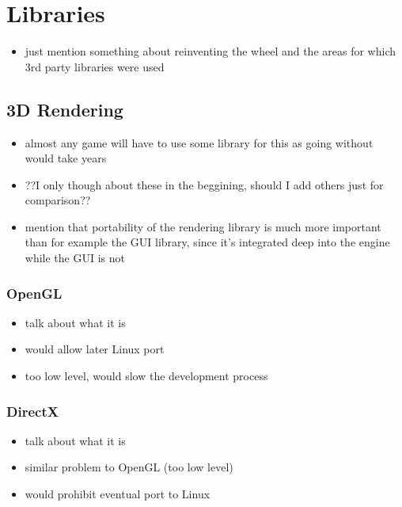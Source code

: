\section{Libraries}

\begin{itemize}
    \item just mention something about reinventing the wheel and
        the areas for which 3rd party libraries were used
\end{itemize}

\subsection{3D Rendering}

\begin{itemize}
    \item almost any game will have to use some library for this as
        going without would take years
    \item ??I only though about these in the beggining, should I add
        others just for comparison??
    \item mention that portability of the rendering library is much more
        important than for example the GUI library, since it's integrated
        deep into the engine while the GUI is not
\end{itemize}

\subsubsection{OpenGL}

\begin{itemize}
    \item talk about what it is
    \item would allow later Linux port
    \item too low level, would slow the development process
\end{itemize}

\subsubsection{DirectX}

\begin{itemize}
    \item talk about what it is
    \item similar problem to OpenGL (too low level)
    \item would prohibit eventual port to Linux
\end{itemize}

